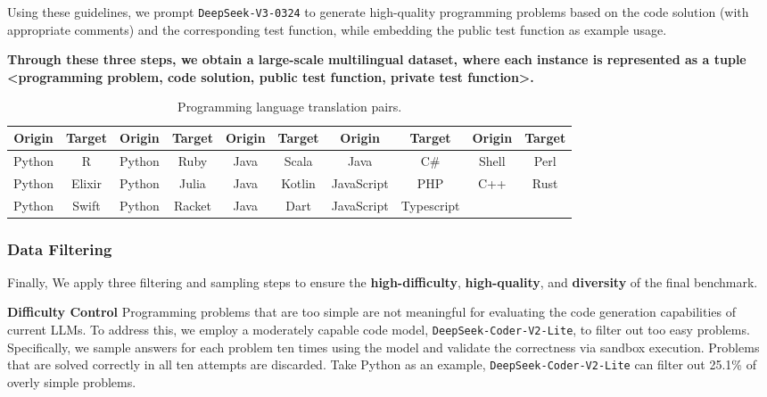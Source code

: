 Using these guidelines, we prompt \texttt{DeepSeek-V3-0324} to generate high-quality programming problems based on the code solution (with appropriate comments) and the corresponding test function, while embedding the public test function as example usage. 

\textbf{Through these three steps, we obtain a large-scale multilingual dataset, where each instance is represented as a tuple \textless{}programming problem, code solution, public test function, private test function\textgreater{}.}






\begin{table}[t]
\small
\centering
\begin{tabular}{cc|cc|cc|cc|cc}
\toprule
\textbf{Origin} & \textbf{Target} & \textbf{Origin} & \textbf{Target} & \textbf{Origin} & \textbf{Target} & \textbf{Origin} & \textbf{Target} & \textbf{Origin} & \textbf{Target} \\ \midrule
 Python          &  R &  Python          &  Ruby  & Java          &  Scala  & Java          &  C\#  &Shell          &  Perl \\
Python          &  Elixir  &Python          &  Julia    & Java         &  Kotlin & JavaScript          &  PHP & C++ & Rust \\ Python          &  Swift   & Python          &  Racket & Java & Dart   &  JavaScript        &  Typescript  \\
\bottomrule
\end{tabular}
\caption{Programming language translation pairs.}
\label{method:translate}
\end{table}






\subsubsection{Data Filtering}
\label{method_data_filtering}

Finally, We apply three filtering and sampling steps to ensure the \textbf{high-difficulty}, \textbf{high-quality}, and \textbf{diversity} of the final benchmark.

\textbf{Difficulty Control} Programming problems that are too simple are not meaningful for evaluating the code generation capabilities of current LLMs. To address this, we employ a moderately capable code model, \texttt{DeepSeek-Coder-V2-Lite}, to filter out too easy problems. Specifically, we sample answers for each problem ten times using the model and validate the correctness via sandbox execution. Problems that are solved correctly in all ten attempts are discarded. Take Python as an example, \texttt{DeepSeek-Coder-V2-Lite} can filter out 25.1\% of overly simple problems.


